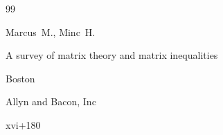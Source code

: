\begin{thebibliography}{99}









\by Marcus~M., Minc~H.

\book A survey of matrix theory and matrix inequalities

\publaddr Boston

\publ Allyn and Bacon, Inc

\totalpages xvi+180 
















\end{thebibliography}





\EngDate



\renewcommand{\baselinestretch}{0.9}



\newpage

\Russian



%

